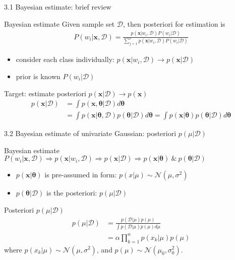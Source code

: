 \documentclass[compress,blue]{beamer}
\newcommand{\bx}{\mathbf{x}}
\newcommand{\calD}{\mathcal{D}}
\begin{document}
\begin{frame}{3.1 Bayesian estimate: brief review}
	\begin{block}{Bayesian estimate}
		Given sample set $\calD$, then posteriori for estimation is
		\begin{align}
			P(w_i | \bx, \calD) = \frac{p(\bx|w_i, \calD)P(w_i | \calD)}{\sum_{j=1}^c p(\bx | w_i, \calD)P(w_i | \calD)}
		\end{align}
		\vspace{-0.15in}
		\small
		\begin{itemize}
			\item consider each class individually: $p(\bx | w_i, \calD) \rightarrow p(\bx | \calD)$
			\item prior is known $P(w_i | \calD)$ 
		\end{itemize}
		Target: estimate posteriori $p(\bx | \calD) \rightarrow p(\bx)$
		\begin{align}
			p(\bx|\calD) &= \int p(\bx, \mathbf{\theta}|\calD) d\mathbf{\theta} \\
			 &= \int p(\bx | \mathbf{\theta}, \calD) p(\mathbf{\theta} | \calD) d\mathbf{\theta} 
			 = \int p(\bx | \mathbf{\theta}) p(\mathbf{\theta} | \calD) d\mathbf{\theta}
		\end{align}	
		\normalsize
	\end{block}	
\end{frame}

\begin{frame}{3.2 Bayesian estimate of univariate Gaussian: posteriori $p(\mu|\calD)$}
	\begin{block}{Bayesian estimate}
		$P(w_i | \bx, \calD) \Rightarrow p(\bx | w_i, \calD) \Rightarrow p(\bx | \calD) \Rightarrow p(\bx | \mathbf{\theta}) ~\&~ p(\mathbf{\theta} | \calD) $
		\begin{itemize}
			\item  $p(\bx | \mathbf{\theta})$ is pre-assumed in form: $p(x|\mu) \sim \mathcal{N}(\mu, \sigma^2)$
			\item $p(\mathbf{\theta} | \calD)$ is the posteriori: $p(\mu|\calD)$
		\end{itemize}
	\end{block}

	\begin{block}{Posteriori $p(\mu|\calD)$}
		\vspace{-0.15in}
		\begin{align}
			p(\mu|\calD) &= \frac{p(\calD | \mu) p(\mu)}{\int p(\calD | \mu) p(\mu) d\mu} \\
			& = \alpha \prod_{k=1}^n p(x_k | \mu)p(\mu)
		\end{align}
		where $p(x_k | \mu) \sim \mathcal{N}(\mu, \sigma^2)$, and $p(\mu) \sim \mathcal{N}(\mu_0, \sigma_0^2)$.
	\end{block}
\end{frame}
\end{document}
